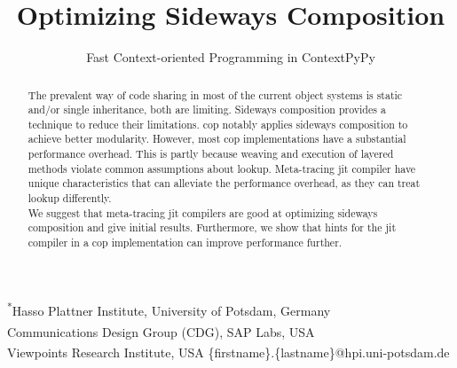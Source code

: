 \documentclass[preprint,english,10pt,nonatbib]{sigplanconf}
\begin{document}



\title{Optimizing Sideways Composition}
\subtitle{Fast Context-oriented Programming in ContextPyPy}

           {\textsuperscript{*}Hasso Plattner Institute, University of Potsdam, Germany\\
           \textsuperscript{\textdagger}Communications Design Group (CDG), SAP Labs, USA\\
           \textsuperscript{\textdagger}Viewpoints Research Institute, USA}
           {\{firstname\}.\{lastname\}@hpi.uni-potsdam.de}

\maketitle

\begin{abstract}
  The prevalent way of code sharing in most of the current object systems is
  static and/or single inheritance, both are limiting. Sideways composition
  provides a technique to reduce their limitations. \Ac{cop} notably applies
  sideways composition to achieve better modularity. However, most \ac{cop}
  implementations have a substantial performance overhead. This is partly
  because weaving and execution of layered methods violate common assumptions
  about lookup. Meta-tracing \ac{jit} compiler have unique characteristics that
  can alleviate the performance overhead, as they can treat lookup
  differently.\\
  We suggest that meta-tracing \ac{jit} compilers are good at optimizing
  sideways composition and give initial results. Furthermore, we show that
  hints for the \ac{jit} compiler in a \ac{cop} implementation can improve
  performance further.
  \end{abstract}
\end{document}
